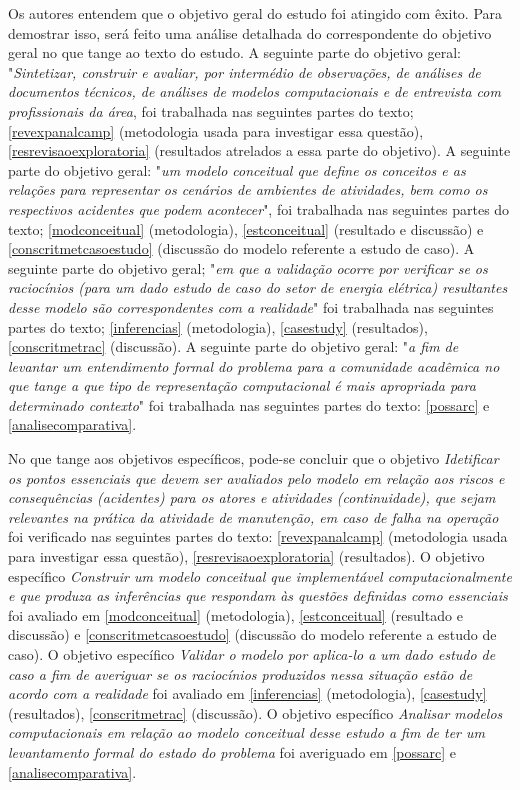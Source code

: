 Os autores entendem que o objetivo geral do estudo foi atingido com êxito. Para demostrar isso, será feito uma análise detalhada do correspondente do objetivo geral no que tange ao texto do estudo. A seguinte parte do objetivo geral: "\textit{Sintetizar, construir e avaliar, por intermédio de observações, de análises de documentos técnicos, de análises de modelos computacionais e de entrevista com profissionais da área}, foi trabalhada nas seguintes partes do texto; \ref{revexpanalcamp} (metodologia usada para investigar essa questão), \ref{resrevisaoexploratoria} (resultados atrelados a essa parte do objetivo).  A seguinte parte do objetivo geral: "\textit{um modelo conceitual que define os conceitos e as relações para representar os cenários de ambientes de atividades, bem como os respectivos acidentes que podem acontecer}", foi trabalhada nas seguintes partes do texto; \ref{modconceitual} (metodologia), \ref{estconceitual} (resultado e discussão) e \ref{conscritmetcasoestudo} (discussão do modelo referente a estudo de caso). A seguinte parte do objetivo geral; "\textit{em que a validação ocorre por verificar se os raciocínios (para um dado estudo de caso do setor de energia elétrica) resultantes desse modelo são correspondentes com a realidade}" foi trabalhada nas seguintes partes do texto; \ref{inferencias} (metodologia), \ref{casestudy} (resultados), \ref{conscritmetrac} (discussão). A seguinte parte do objetivo geral: "\textit{a fim de levantar um entendimento formal do problema para a comunidade acadêmica no que tange a que tipo de representação computacional é mais apropriada para determinado contexto}" foi trabalhada nas seguintes partes do texto: \ref{possarc} e \ref{analisecomparativa}.

No que tange aos objetivos específicos, pode-se concluir que o objetivo \textit{Idetificar os pontos essenciais que devem ser avaliados pelo modelo em relação aos riscos e consequências (acidentes) para os atores e atividades (continuidade), que sejam relevantes na prática da atividade de manutenção, em caso de falha na operação} foi verificado nas seguintes partes do texto: \ref{revexpanalcamp} (metodologia usada para investigar essa questão), \ref{resrevisaoexploratoria} (resultados). O objetivo específico \textit{Construir um modelo conceitual que implementável computacionalmente e que produza as inferências que respondam às questões definidas como essenciais} foi avaliado em \ref{modconceitual} (metodologia), \ref{estconceitual} (resultado e discussão) e \ref{conscritmetcasoestudo} (discussão do modelo referente a estudo de caso). O objetivo específico \textit{Validar o modelo por aplica-lo a um dado estudo de caso a fim de averiguar se os raciocínios produzidos nessa situação estão de acordo com a realidade} foi avaliado em \ref{inferencias} (metodologia), \ref{casestudy} (resultados), \ref{conscritmetrac} (discussão). O objetivo específico \textit{Analisar modelos computacionais em relação ao modelo conceitual desse estudo a fim de ter um levantamento formal do estado do problema} foi averiguado em \ref{possarc} e \ref{analisecomparativa}.